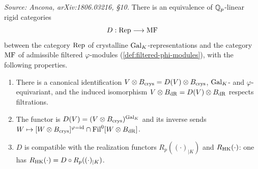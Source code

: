 \begin{theorem}
  \label{thm:crys-equiv}
  \textit{Source: Ancona, arXiv:1806.03216, \S10.}
  There is an equivalence of \(\mathbb{Q}_p\)-linear rigid categories
  \[D : \mathrm{Rep} \longrightarrow \mathrm{MF}\]
  between the category \(\mathrm{Rep}\) of crystalline \(\mathrm{Gal}_K\)-representations and the
  category \(\mathrm{MF}\) of admissible filtered \(\varphi\)-modules
  (\cref{def:filtered-phi-modules}), with the following properties.
  \begin{enumerate}
    \item There is a canonical identification \(V \otimes B_{\mathrm{crys}} = D(V) \otimes
      B_{\mathrm{crys}}\), \(\mathrm{Gal}_K\)- and \(\varphi\)-equivariant, and the induced
      isomorphism \(V \otimes B_{\mathrm{dR}} = D(V) \otimes B_{\mathrm{dR}}\) respects filtrations.
    \item The functor is \(D(V) = (V \otimes B_{\mathrm{crys}})^{\mathrm{Gal}_K}\) and its inverse
      sends \(W \mapsto [W \otimes B_{\mathrm{crys}}]^{\varphi=\mathrm{id}} \cap \mathrm{Fil}^0[W \otimes
      B_{\mathrm{dR}}]\).
    \item \(D\) is compatible with the realization functors \(R_p((\cdot)_{\vert
      K})\) and \(R_{\mathrm{HK}}(\cdot)\): one has \(R_{\mathrm{HK}}(\cdot) = D \circ R_p((\cdot)_{\vert
      K})\).
  \end{enumerate}
\end{theorem}


